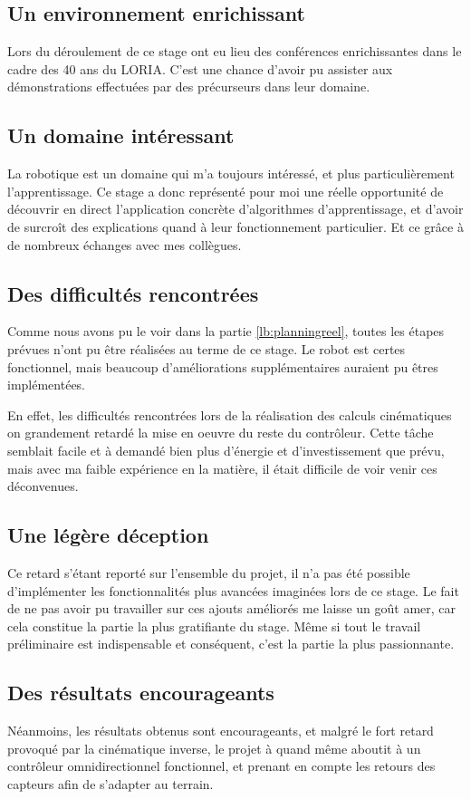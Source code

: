 \documentclass{tnreport}
\begin{document}
\subsection{Un environnement enrichissant}
Lors du déroulement de ce stage ont eu lieu des conférences enrichissantes dans le cadre des 40 ans du \gls{LORIA}. C'est une chance d'avoir pu assister aux démonstrations effectuées par des précurseurs dans leur domaine. 

\subsection{Un domaine intéressant}
La robotique est un domaine qui m'a toujours intéressé, et plus particulièrement l'apprentissage. Ce stage a donc représenté pour moi une réelle opportunité de découvrir en direct l'application concrète d'algorithmes d'apprentissage, et d'avoir de surcroît des explications quand à leur fonctionnement particulier. Et ce grâce à de nombreux échanges avec mes collègues. 
\subsection{Des difficultés rencontrées}
Comme nous avons pu le voir dans la partie \ref{lb:planningreel}, toutes les étapes prévues n'ont pu être réalisées au terme de ce stage. Le robot est certes fonctionnel, mais beaucoup d'améliorations supplémentaires auraient pu êtres implémentées. 

En effet, les difficultés rencontrées lors de la réalisation des calculs cinématiques on grandement retardé la mise en oeuvre du reste du contrôleur. Cette tâche semblait facile et à demandé bien plus d'énergie et d'investissement que prévu, mais avec ma faible expérience en la matière, il était difficile de voir venir ces déconvenues.

\subsection{Une légère déception}
Ce retard s'étant reporté sur l'ensemble du projet, il n'a pas été possible d'implémenter les fonctionnalités plus avancées imaginées lors de ce stage. Le fait de ne pas avoir pu travailler sur ces ajouts améliorés me laisse un goût amer, car cela constitue la partie la plus gratifiante du stage. Même si tout le travail préliminaire est indispensable et conséquent, c'est la partie la plus passionnante. 

\subsection{Des résultats encourageants}
Néanmoins, les résultats obtenus sont encourageants, et malgré le fort retard provoqué par la cinématique inverse, le projet à quand même aboutit à un contrôleur omnidirectionnel fonctionnel, et prenant en compte les retours des capteurs afin de s'adapter au terrain. 
\end{document}
